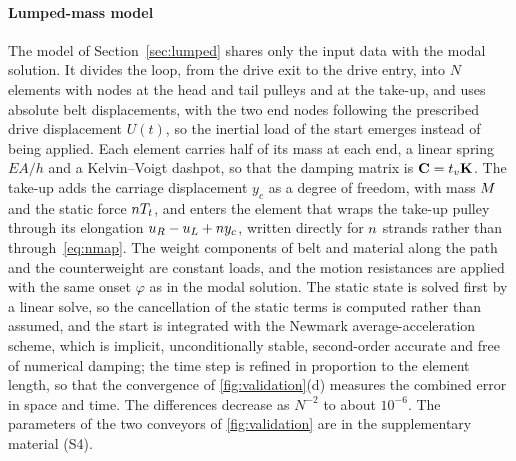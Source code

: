 \paragraph{Lumped-mass model} The model of Section~\ref{sec:lumped} shares only the input
data with the modal solution. It divides the loop, from the drive exit to the drive entry,
into $N$ elements with nodes at the head and tail pulleys and at the take-up, and uses absolute
belt displacements, with the two end nodes following the prescribed drive displacement $U(t)$,
so the inertial load of the start emerges instead of being applied. Each element carries half
of its mass at each end, a linear spring $EA/h$ and a Kelvin--Voigt dashpot, so that the
damping matrix is $\mathbf{C}=t_v\mathbf{K}$. The take-up adds the carriage displacement $y_c$ as a
degree of freedom, with mass $M$ and the static force $nT_t$, and enters the element
that wraps the take-up pulley through its elongation $u_R-u_L+n y_c$, written directly for
$n$ strands rather than through~\eqref{eq:nmap}. The weight components of belt and
material along the path and the counterweight are constant loads, and the motion resistances
are applied with the same onset $\varphi$ as in the modal solution. The static state is solved
first by a linear solve, so the cancellation of the static terms is computed rather than
assumed, and the start is integrated with the Newmark average-acceleration scheme, which is
implicit, unconditionally stable, second-order accurate and free of numerical damping; the time
step is refined in proportion to the element length, so that the convergence of
\cref{fig:validation}(d) measures the combined error in space and time. The differences
decrease as $N^{-2}$ to about $10^{-6}$. The parameters of the two conveyors of
\cref{fig:validation} are in the supplementary material (S4).
